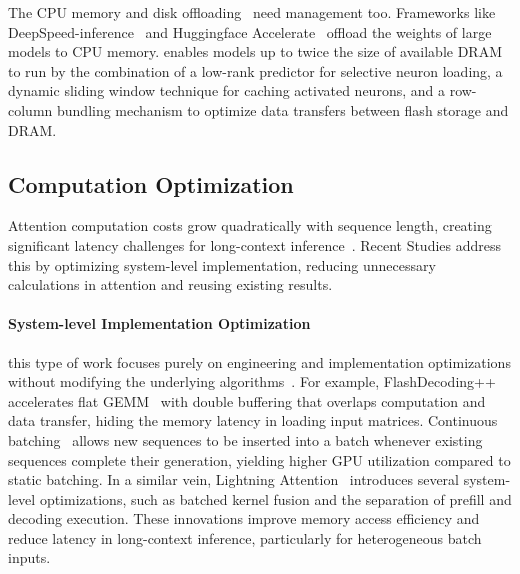 The CPU memory and disk offloading~\citep{liu2023deja} need management too. Frameworks like DeepSpeed-inference~\citep{aminabadi2022deepspeed} and Huggingface Accelerate~\citep{Huggingface2022accelerate} offload the weights of large models to CPU memory. \citet{alizadeh2023llm} enables models up to twice the size of available DRAM to run by the combination of a low-rank predictor for selective neuron loading, a dynamic sliding window technique for caching activated neurons, and a row-column bundling mechanism to optimize data transfers between flash storage and DRAM.

\subsection{Computation Optimization}\label{sec7_2}

Attention computation costs grow quadratically with sequence length, creating significant latency challenges for long-context inference~\citep{beltagy2020longformer, liu2024reattention}. Recent Studies address this by optimizing system-level implementation, reducing unnecessary calculations in attention and reusing existing results.

\paragraph{System-level Implementation Optimization}
this type of work focuses purely on engineering and implementation optimizations without modifying the underlying algorithms~\citep{daoflashattention, dao2022flashattention, shah2024flashattention, cascade-inference, FlashInfer0.2, ye2025flashinfer, llama.cpp}. For example, FlashDecoding++~\citep{hong2023flashdecoding++} accelerates flat GEMM~\citep{FastGEMV, ibrahim2024balanced} with double buffering that overlaps computation and data transfer, hiding the memory latency in loading input matrices. Continuous batching~\citep{Gyeong280922Orca, anyscale2024selective, kwon2023efficient} allows new sequences to be inserted into a batch whenever existing sequences complete their generation, yielding higher GPU utilization compared to static batching. In a similar vein, Lightning Attention~\citep{minimax2025minimax01scalingfoundationmodels} introduces several system-level optimizations, such as batched kernel fusion and the separation of prefill and decoding execution. These innovations improve memory access efficiency and reduce latency in long-context inference, particularly for heterogeneous batch inputs.

